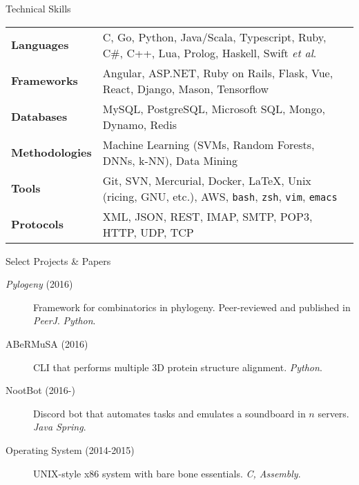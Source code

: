 \documentclass{resume} %
\begin{document}

\begin{rSection}{Technical Skills}

\begin{tabular}{ @{} >{\bfseries}l @{\hspace{1ex}} l }
Languages & C, Go, Python, Java/Scala, Typescript, Ruby, C\#, C++, Lua, Prolog, Haskell, Swift \textit{et al}. \\
Frameworks & Angular, ASP.NET, Ruby on Rails, Flask, Vue, React, Django, Mason, Tensorflow \\ 
Databases & MySQL, PostgreSQL, Microsoft SQL, Mongo, Dynamo, Redis \\
Methodologies & Machine Learning (SVMs, Random Forests, DNNs, k-NN), Data Mining \\
Tools & Git, SVN, Mercurial, Docker, \LaTeX, Unix (ricing, GNU, etc.), AWS, \texttt{bash}, \texttt{zsh}, \texttt{vim}, \texttt{emacs} \\
Protocols & XML, JSON, REST, IMAP, SMTP, POP3, HTTP, UDP, TCP
\end{tabular}

\end{rSection}


\begin{rSection}{Select Projects \& Papers}

\begin{description}
\item [\textit{Pylogeny} (2016)] Framework for combinatorics in phylogeny. Peer-reviewed and published in \textit{PeerJ}. \textit{Python}.
\item [ABeRMuSA (2016)] CLI that performs multiple 3D protein structure alignment. \textit{Python}.
\item [NootBot (2016-)] Discord bot that automates tasks and emulates a soundboard in $n$ servers. \textit{Java Spring}.
\item [Operating System (2014-2015)] UNIX-style x86 system with bare bone essentials. \textit{C, Assembly}.
\end{description}

\end{rSection}

\end{document}
